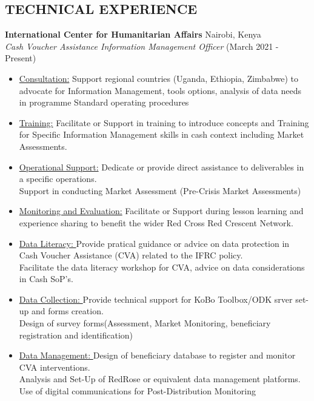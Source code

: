 \documentclass[line,margin,10pt]{res}
\begin{document}
\begin{resume}
\section{TECHNICAL EXPERIENCE}
\textbf{International Center for Humanitarian Affairs} \hfill Nairobi, Kenya\\
{\sl Cash Voucher Assistance Information Management Officer} \hfill (March 2021 - Present)
\begin{itemize} \itemsep -2pt
	\item \underline{Consultation:}
    Support regional countries (Uganda, Ethiopia, Zimbabwe) to advocate for Information Management, tools options, analysis of data needs in programme Standard operating procedures
    \item \underline{Training:}
    Facilitate or Support in training to introduce concepts and Training for Specific Information Management skills in cash context including Market Assessments.
    \item \underline{Operational Support:}
    Dedicate or provide direct assistance to deliverables in a specific operations.\\
    Support in conducting Market Assessment (Pre-Crisis Market Assessments)\\
    \item \underline{Monitoring and Evaluation:}
    Facilitate or Support during lesson learning and experience sharing to benefit the wider Red Cross Red Crescent Network.
    \item \underline{Data Literacy: }
    Provide pratical guidance or advice on data protection in Cash Voucher Assistance (CVA) related to the IFRC policy.\\
    Facilitate the data literacy workshop for CVA, advice on data considerations in Cash SoP's.\\
    \item \underline{Data Collection: }
    Provide technical support for KoBo Toolbox/ODK srver set-up and forms creation.\\
    Design of survey forms(Assessment, Market Monitoring, beneficiary registration and identification)\\
    \item \underline{Data Management: }
    Design of beneficiary database to register and monitor CVA interventions.\\
    Analysis and Set-Up of RedRose or equivalent data management platforms.\\
    Use of digital communications for Post-Distribution Monitoring\\

\end{itemize}
\end{resume}
\end{document}
